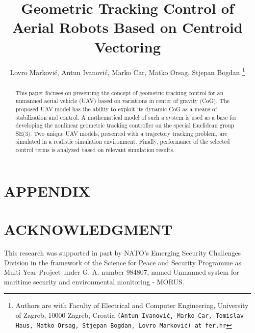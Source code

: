 \documentclass[letterpaper, 10 pt, conference]{ieeeconf}  %
\title{\LARGE \bf
Geometric Tracking Control of Aerial Robots Based on Centroid Vectoring
}
\author{Lovro Marković, Antun Ivanović, Marko Car, Matko Orsag, Stjepan Bogdan
	\thanks{Authors are with Faculty of Electrical and Computer Engineering,
        University of Zagreb, 10000 Zagreb, Croatia
        {\tt\small (Antun Ivanović, Marko Car, Tomislav Haus, Matko Orsag, Stjepan Bogdan, Lovro Marković) at fer.hr}}}%
\begin{document}
\maketitle

\thispagestyle{empty}
\pagestyle{empty}


\begin{abstract}

This paper focuses on presenting the concept of geometric tracking control for an unmanned aerial vehicle (UAV) based on variations in center of gravity (CoG). The proposed UAV model has the ability to exploit its dynamic CoG as a means of stabilization and control. A mathematical model of such a system is used as a base for developing the nonlinear geometric tracking controller on the special Euclidean group SE(3). Two unique UAV models, presented with a trajectory tracking problem, are simulated in a realistic simulation environment. Finally, performance of the selected control terms is analyzed based on relevant simulation results.

\end{abstract}




%




\section*{APPENDIX}



\section*{ACKNOWLEDGMENT}

This research was supported in part by NATO's Emerging Security Challenges Division in the framework of the Science for Peace and Security Programme as Multi Year Project under G. A. number 984807, named Unmanned system for maritime security and environmental monitoring - MORUS.



\nocite{*}


\end{document}
